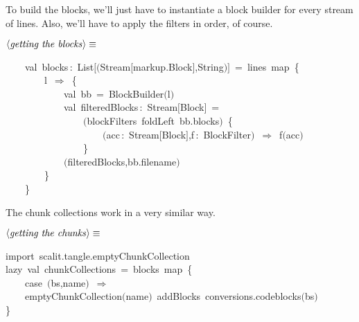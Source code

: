 \documentclass[a4paper,12pt]{article}
\begin{document}
To build the blocks, we'll just have to instantiate a block builder
for every stream of lines. Also, we'll have to apply the filters in order,
of course.

$\left<\mbox{\emph{getting the blocks}}\right>\equiv$
\begin{program}~~~~{\vem val}~blocks\,{\rm :}~List$[$$($Stream$[$markup.Block$]$,String$)$$]$~=~lines~map~{\small\{}
\\~~~~~~~~l~$\Rightarrow$~{\small\{}
\\~~~~~~~~~~~~{\vem val}~bb~=~BlockBuilder$($l$)$
\\~~~~~~~~~~~~{\vem val}~filteredBlocks\,{\rm :}~Stream$[$Block$]$~=
\\~~~~~~~~~~~~~~~~$($blockFilters~foldLeft~bb.blocks$)$~{\small\{}
\\~~~~~~~~~~~~~~~~~~~~$($acc\,{\rm :}~Stream$[$Block$]$,f\,{\rm :}~BlockFilter$)$~$\Rightarrow$~f$($acc$)$
\\~~~~~~~~~~~~~~~~{\small\}}
\\~~~~~~~~~~~~$($filteredBlocks,bb.filename$)$
\\~~~~~~~~{\small\}}
\\~~~~{\small\}}
\\[0.5em]\end{program}


The chunk collections work in a very similar way.

$\left<\mbox{\emph{getting the chunks}}\right>\equiv$
\begin{program}{\vem import}~scalit.tangle.emptyChunkCollection
\\{\vem lazy}~{\vem val}~chunkCollections~=~blocks~map~{\small\{}
\\~~~~{\vem case}~$($bs,name$)$~$\Rightarrow$
\\~~~~emptyChunkCollection$($name$)$~addBlocks~conversions.codeblocks$($bs$)$
\\{\small\}}
\end{program}
\end{document}
